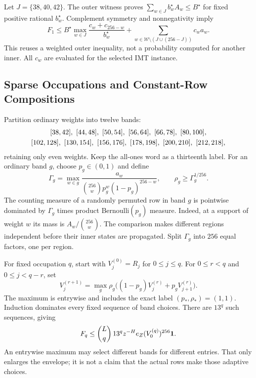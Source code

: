 Let $J=\{38,40,42\}$. The outer witness proves
$\sum_{w\in J}b_w^\star A_w\le B^\star$ for fixed positive rational
$b_w^\star$. Complement symmetry and nonnegativity imply
\begin{equation}
 F_1\le
 B^\star\max_{w\in J}\frac{c_w+c_{256-w}}{b_w^\star}
 +\sum_{w\in\mathcal W\setminus(J\cup(256-J))}c_w a_w.
 \label{eq:finite-q1-domination}
\end{equation}
This reuses a weighted outer inequality, not a probability computed for
another inner. All $c_w$ are evaluated for the selected IMT instance.

\subsection{Sparse Occupations and Constant-Row Compositions}

Partition ordinary weights into twelve bands:
\[
\begin{gathered}
\relax[38,42],\ [44,48],\ [50,54],\ [56,64],\ [66,78],\ [80,100],\\
[102,128],\ [130,154],\ [156,176],\ [178,198],\ [200,210],\ [212,218],
\end{gathered}
\]
retaining only even weights. Keep the all-ones word as a thirteenth label.
For an ordinary band $g$, choose $p_g\in(0,1)$ and define
\[
 \Gamma_g=\max_{w\in g}
 \frac{a_w}{\binom{256}{w}p_g^w(1-p_g)^{256-w}},
 \qquad \rho_g\ge\Gamma_g^{1/256}.
\]
The counting measure of a randomly permuted row in band $g$ is pointwise
dominated by $\Gamma_g$ times product Bernoulli$(p_g)$ measure.
Indeed, at a support of weight $w$ its mass is $A_w/\binom{256}{w}$.
The comparison makes different regions independent before their inner states
are propagated. Split $\Gamma_g$ into $256$ equal factors, one per region.

For fixed occupation $q$, start with $V_j^{(0)}=R_j$ for $0\le j\le q$.
For $0\le r<q$ and $0\le j<q-r$, set
\[
 V_j^{(r+1)}=
 \max_g \rho_g\bigl((1-p_g)V_j^{(r)}+p_gV_{j+1}^{(r)}\bigr).
\]
The maximum is entrywise and includes the exact label $(p_*,\rho_*)=(1,1)$.
Induction dominates every fixed sequence of band choices. There are $13^q$
such sequences, giving
\begin{equation}
 F_q\le\binom Lq\,13^qz^{-H}e_Z(V_0^{(q)})^{256}\mathbf 1.
 \label{eq:finite-sparse-bound}
\end{equation}
An entrywise maximum may select different bands for different entries.
That only enlarges the envelope; it is not a claim that the actual rows
make those adaptive choices.

